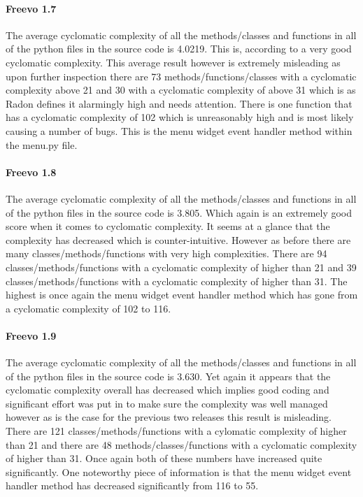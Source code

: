 \documentclass[10.5pt,journal, a4paper]{IEEEtran}
\begin{document}
\paragraph{Freevo 1.7}
\noindent
The average cyclomatic complexity of all the methods/classes and functions in all of the python files in the source code is 4.0219. This is, according to \cite{mcCabe} a very good cyclomatic complexity. This average result however is extremely misleading as upon further inspection there are 73 methods/functions/classes with a cyclomatic complexity above 21 and 30 with a cyclomatic complexity of above 31 which is as Radon defines it alarmingly high and needs attention. There is one function that has a cyclomatic complexity of 102 which is unreasonably high and is most likely causing a number of bugs. This is the menu widget event handler method within the menu.py file. \\ 

\paragraph{Freevo 1.8}
\noindent
The average cyclomatic complexity of all the methods/classes and functions in all of the python files in the source code is 3.805. Which again is an extremely good score when it comes to cyclomatic complexity. It seems at a glance that the complexity has decreased which is counter-intuitive. However as before there are many classes/methods/functions with very high complexities. There are 94 classes/methods/functions with a cyclomatic complexity of higher than 21 and 39 classes/methods/functions with a cyclomatic complexity of higher than 31. The highest is once again the menu widget event handler method which has gone from a cyclomatic complexity of 102 to 116. 

\paragraph{Freevo 1.9}
\noindent
The average cyclomatic complexity of all the methods/classes and functions in all of the python files in the source code is 3.630. Yet again it appears that the cyclomatic complexity overall has decreased which implies good coding and significant effort was put in to make sure the complexity was well managed however as is the case for the previous two releases this result is misleading. There are 121 classes/methods/functions with a cylomatic complexity of higher than 21 and there are 48 methods/classes/functions with a cyclomatic complexity of higher than 31. Once again both of these numbers have increased quite significantly. One noteworthy piece of information is that the menu widget event handler method has decreased significantly from 116 to 55. \\
\end{document}
